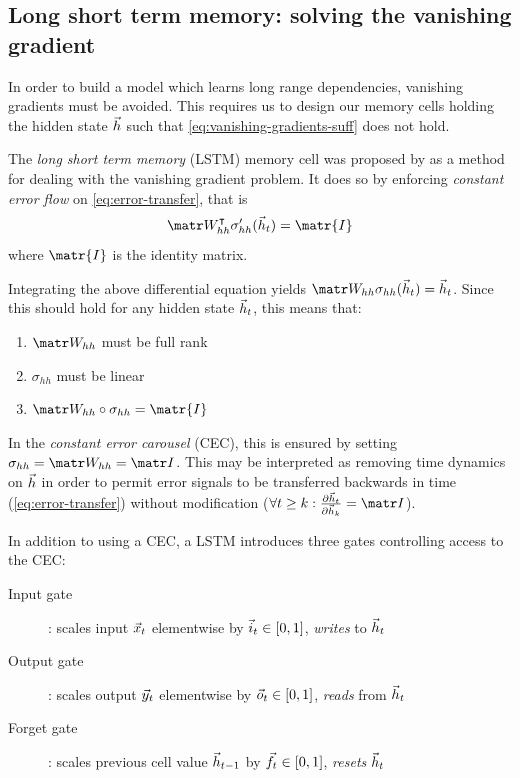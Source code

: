 \subsection{Long short term memory: solving the vanishing gradient}


In order to build a model which learns long range dependencies, vanishing
gradients must be avoided. This requires us to design our memory cells holding
the hidden state $\vec{h}$ such that \cref{eq:vanishing-gradients-suff} does
not hold.

The \emph{long short term memory} (LSTM) memory cell was proposed by
\citet{hochreiter1997long} as a method for dealing with the vanishing gradient
problem. It does so by enforcing \emph{constant error flow} on
\cref{eq:error-transfer}, that is
\begin{equation}
    \W_{hh}^\tp \sigma_{hh}' (\h_{t}) = \matr{I}
\end{equation}
where $\matr{I}$ is the identity matrix.

Integrating the above differential equation yields $\W_{hh} \sigma_{hh}(\h_{t}) = \h_{t}$.
Since this should hold for any hidden state $\vec{h}_{t}$, this means that:
\begin{enumerate}
    \item $\W_{hh}$ must be full rank
    \item $\sigma_{hh}$ must be linear
    \item $\W_{hh} \circ \sigma_{hh} = \matr{I}$
\end{enumerate}

In the \emph{constant error carousel} (CEC), this is ensured by setting
$\sigma_{hh} = \W_{hh} = \I$. This may be interpreted as removing time dynamics
on $\vec{h}$ in order to permit error signals to be transferred backwards in time
(\cref{eq:error-transfer}) without modification (\ie $\forall t \geq k: \frac{\pd
\h_t}{\pd \h_k} = \I$).

In addition to using a CEC, a LSTM introduces three gates controlling access to the CEC:
\begin{description}
  \item[Input gate]: scales input $\vec{x}_t$ elementwise by $\vec{i}_t \in [0,1]$, \emph{writes} to $\vec{h}_t$
  \item[Output gate]: scales output $\vec{y}_t$ elementwise by $\vec{o}_t \in [0,1]$, \emph{reads} from $\vec{h}_t$
  \item[Forget gate]: scales previous cell value $\vec{h}_{t-1}$ by $\vec{f}_t \in [0,1]$, \emph{resets} $\vec{h}_t$
\end{description}

